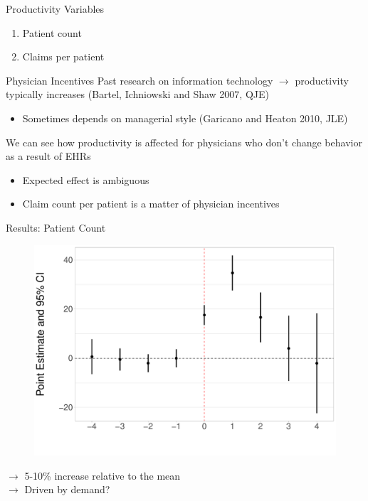 \documentclass[10pt]{beamer}
\begin{document}
\begin{frame}{Productivity Variables}
    \begin{enumerate}
        \item Patient count
        \vspace{6mm}
        \item Claims per patient
    \end{enumerate}
\end{frame}

\begin{frame}{Physician Incentives}
Past research on information technology $\rightarrow$ productivity typically increases \scriptsize (Bartel, Ichniowski and Shaw 2007, QJE)
                \vspace{3mm}
\begin{itemize}
                \normalsize 
    \item Sometimes depends on managerial style \scriptsize(Garicano and Heaton 2010, JLE)
\end{itemize}
                \vspace{6mm}
                \normalsize 
We can see how productivity is affected for physicians who don't change behavior as a result of EHRs
                \vspace{3mm}
\begin{itemize}
    \item Expected effect is ambiguous
                \vspace{3mm}
    \item Claim count per patient is a matter of physician incentives
\end{itemize}
\end{frame}

\begin{frame}{Results: Patient Count}
\begin{figure}[ht]
\centering
\includegraphics[scale=.35]{Objects/Presentation_patients_all.pdf}
\end{figure}
$\rightarrow$ 5-10\% increase relative to the mean\\
$\rightarrow$ Driven by demand? 
\end{frame}
\end{document}
